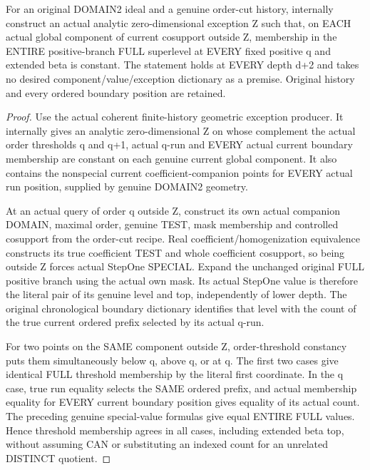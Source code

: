 \begin{theorem}
\label{hir:original-order-cut-positive-full-component-dictionary}
\leanok
For an original DOMAIN2 ideal and a genuine order-cut history, internally
construct an actual analytic zero-dimensional exception Z such that, on EACH
actual global component of current cosupport outside Z, membership in the
ENTIRE positive-branch FULL superlevel at EVERY fixed positive q and extended
beta is constant. The statement holds at EVERY depth d+2 and takes no desired
component/value/exception dictionary as a premise. Original history and every
ordered boundary position are retained.
\end{theorem}
\begin{proof}
Use the actual coherent finite-history geometric exception producer. It
internally gives an analytic zero-dimensional Z on whose complement the
actual order thresholds q and q+1, actual q-run and EVERY actual current
boundary membership are constant on each genuine current global component.
It also contains the nonspecial current coefficient-companion points for
EVERY actual run position, supplied by genuine DOMAIN2 geometry.

At an actual query of order q outside Z, construct its own actual companion
DOMAIN, maximal order, genuine TEST, mask membership and controlled cosupport
from the order-cut recipe. Real coefficient/homogenization equivalence
constructs its true coefficient TEST and whole coefficient cosupport, so
being outside Z forces actual StepOne SPECIAL. Expand the unchanged original
FULL positive branch using the actual own mask. Its actual StepOne value is
therefore the literal pair of its genuine level and top, independently of
lower depth. The original chronological boundary dictionary identifies that
level with the count of the true current ordered prefix selected by its
actual q-run.

For two points on the SAME component outside Z, order-threshold constancy
puts them simultaneously below q, above q, or at q. The first two cases give
identical FULL threshold membership by the literal first coordinate. In the
q case, true run equality selects the SAME ordered prefix, and actual
membership equality for EVERY current boundary position gives equality of
its actual count. The preceding genuine special-value formulas give equal
ENTIRE FULL values. Hence threshold membership agrees in all cases, including
extended beta top, without assuming CAN or substituting an indexed count for
an unrelated DISTINCT quotient.
\end{proof}

